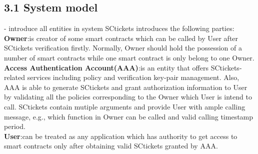 \subsection*{3.1 System model}
- introduce all entities in system
\noindent SCtickets introduces the following parties:
\\
\textbf{Owner}:is creator of some smart contracts which can be called by User after SCtickets verification
firstly. Normally, Owner should hold the possession of a number of smart contracts while one smart contract is only belong to one Owner.
\\
\textbf{Access Authentication Account(AAA)}:is an entity that offers SCtickets-related services including policy and verification key-pair management. Also, AAA is able to generate SCtickets and grant authorization information to User by validating all the policies corresponding to the Owner which User is intend to call. SCtickets contain mutiple arguments and provide User with ample calling message, e.g., which function in Owner can be called and valid calling timestamp period.
\\
\textbf{User}:can be treated as any application which has authority to get access to smart contracts only after obtaining valid SCtickets granted by AAA.


